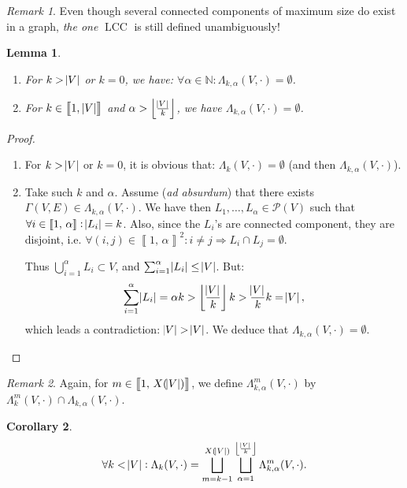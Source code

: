 \documentclass{article}
\newtheorem{lemma}{Lemma}[section]
\newtheorem{corollary}[lemma]{Corollary}
\theoremstyle{definition}
\theoremstyle{remark}
\newtheorem*{remark}{Remark}
\DeclareMathOperator{\LCC}{LCC}
\newcommand{\N}{\mathbb N}
\newcommand{\intint}[2]{\left\llbracket#1, \, #2\right\rrbracket}
\newcommand{\floor}[1]{\left\lfloor#1\right\rfloor}
\begin{document}
		\begin{remark} Even though several connected components of maximum size do exist in a graph, \textit{the one} $\LCC$ is still defined unambiguously!
		\end{remark}

		\begin{lemma}~
		\begin{enumerate}
			\item For $k > \abs V$ or $k=0$, we have: $\forall \alpha \in \N : \Lambda_{k,\alpha}(V, \cdot) = \emptyset$.
			\item For $k \in \intint 1{\abs V}$ and $\alpha > \floor {\frac {\abs V}k}$, we have $\Lambda_{k,\alpha}(V, \cdot) = \emptyset$.
		\end{enumerate}
		\end{lemma}

		\begin{proof}~
		\begin{enumerate}
			\item For $k > \abs V$ or $k=0$, it is obvious that: $\Lambda_k(V, \cdot) = \emptyset$ (and then $\Lambda_{k,\alpha}(V, \cdot)$).
			\item Take such $k$ and $\alpha$. Assume (\textit{ad absurdum}) that there exists $\Gamma(V, E) \in \Lambda_{k, \alpha}(V, \cdot)$. We have then
			$L_1, \ldots, L_\alpha \in \mathcal P(V)$ such that $\forall i \in \intint 1\alpha : \abs {L_i} = k$. Also, since the $L_i$'s are connected component,
			they are disjoint, i.e. $\forall (i, j) \in \intint 1\alpha^2 : i \neq j \Rightarrow L_i \cap L_j = \emptyset$.

			Thus $\bigcup_{i=1}^\alpha L_i \subset V$, and $\sum_{i=1}^\alpha \abs {L_i} \leq \abs V$. But:
			\[\sum_{i=1}^\alpha\abs {L_i} = \alpha k > \floor {\frac {\abs V}k}k > \frac {\abs V}kk = \abs V,\]
			which leads a contradiction: $\abs V > \abs V$.
			We deduce that $\Lambda_{k,\alpha}(V, \cdot) = \emptyset$.
		\end{enumerate}
		\end{proof}

		\begin{remark} Again, for $m \in \intint 1{X(\abs V)}$, we define $\Lambda_{k,\alpha}^m(V, \cdot)$ by $\Lambda_k^m(V, \cdot) \cap \Lambda_{k,\alpha}(V, \cdot)$.
		\end{remark}

		\begin{corollary}
		\[\forall k < \abs V : \Lambda_k(V, \cdot) = \bigsqcup_{m=k-1}^{X(\abs V)}\bigsqcup_{\alpha=1}^{\floor {\frac {\abs V}k}}\Lambda_{k,\alpha}^m(V, \cdot).\]
		\end{corollary}
\end{document}
